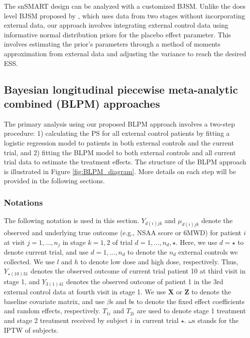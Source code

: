 The \ac{snSMART} design can be analyzed with a customized \ac{BJSM}. Unlike the does level \ac{BJSM} proposed by \cite{fang2023comparing}, which uses data from two stages without incorporating external data, our approach involves integrating external control data using informative normal distribution priors for the placebo effect parameter. This involves estimating the prior's parameters through a method of moments approximation from external data and adjusting the variance to reach the desired \ac{ESS}.

\subsection{Bayesian longitudinal piecewise meta-analytic combined (BLPM) approaches}
The primary analysis using our proposed \ac{BLPM} approach involves a two-step procedure: 1) calculating the \ac{PS} \citep{rosenbaum1983central} for all external control patients by fitting a logistic regression model to patients in both external controls and the current trial, and 2) fitting the \ac{BLPM} model to both external controls and all current trial data to estimate the treatment effects. The structure of the \ac{BLPM} approach is illustrated in Figure \ref{fig:BLPM_diagram}. More details on each step will be provided in the following sections.


\subsubsection{Notations}
The following notation is used in this section. $Y_{d(i)jk}$ and $\mu_{d(i)jk}$ denote the observed and underlying true outcome (e.g., \ac{NSAA} score or \ac{6MWD}) for patient $i$ at visit $j = 1,...,n_j$ in stage $k = 1, 2$ of trial $d = 1,...,n_d,\star$. Here, we use $d = \star$ to denote current trial, and use $d = 1,...,n_d$ to denote the $n_d$ external controls we collected. We use $l$ and $h$ to denote low dose and high dose, respectively. Thus, $Y_{\star(10)31}$ denotes the observed outcome of current trial patient 10 at third visit in stage 1, and $Y_{3(1)41}$ denotes the observed outcome of patient 1 in the 3rd external control data at fourth visit in stage 1. We use $\boldsymbol{X}$ or $\boldsymbol{Z}$ to denote the baseline covariate matrix, and use $\beta$s and $b$s to denote the fixed effect coefficients and random effects, respectively. $T_{1i}$ and $T_{2i}$ are used to denote stage 1 treatment and stage 2 treatment received by subject $i$ in current trial $\star$. $\omega$s stands for the \ac{IPTW} of subjects.

